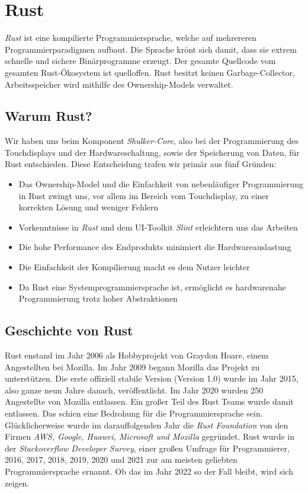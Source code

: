 \section{Rust}
\label{Rust}
\lstset{language=rust}

\textit{Rust} ist eine kompilierte Programmiersprache, welche auf mehrereren
Programmierparadigmen aufbaut. Die Sprache krönt sich damit, dass
sie extrem schnelle und sichere Binärprogramme erzeugt. Der gesamte Quellcode
vom gesamten Rust-Ökosystem ist quelloffen. Rust besitzt keinen Garbage-Collector,
Arbeitsspeicher wird mithilfe des Ownership-Models verwaltet.

\subsection{Warum Rust?}
Wir haben uns beim Komponent \textit{Shulker-Core}, also bei der Programmierung
des Touchdisplays und der Hardwareschaltung, sowie der Speicherung
von Daten, für Rust entschieden. Diese Entscheidung trafen wir primär
aus fünf Gründen:

\begin{itemize}
    \item Das Ownership-Model und die Einfachkeit von nebenläufiger Programmierung in Rust zwingt uns, vor allem im Bereich vom Touchdisplay, zu einer korrekten Lösung und weniger Fehlern
    \item Vorkenntnisse in \textit{Rust} und dem UI-Toolkit \textit{Slint} erleichtern uns das Arbeiten
    \item Die hohe Performance des Endprodukts minimiert die Hardwareauslastung
    \item Die Einfachkeit der Kompilierung macht es dem Nutzer leichter
    \item Da Rust eine Systemprogrammiersprache ist, ermöglicht es hardwarenahe Programmierung trotz hoher Abstraktionen
\end{itemize}

\subsection{Geschichte von Rust}
Rust enstand im Jahr 2006 als Hobbyprojekt von Graydon Hoare, einem Angestellten
bei Mozilla. Im Jahr 2009 begann Mozilla das Projekt zu unterstützen. Die erste
offiziell stabile Version (Version 1.0) wurde im Jahr 2015, also ganze neun Jahre danach, veröffentlicht.
Im Jahr 2020 wurden 250 Angestellte von Mozilla entlassen.  Ein großer
Teil des Rust Teams wurde damit entlassen. Das schien eine Bedrohung für
die Programmiersprache sein. Glücklicherweise wurde im darauffolgenden Jahr die
\textit{Rust Foundation} von den Firmen \textit{AWS, Google, Huawei, Microsoft und Mozilla} gegründet.
Rust wurde in der \textit{Stackoverflow Developer Survey}, einer großen Umfrage
für Programmierer, 2016, 2017, 2018, 2019, 2020 und 2021 zur am meisten geliebten Programmiersprache
ernannt. Ob das im Jahr 2022 so der Fall bleibt, wird sich zeigen.


